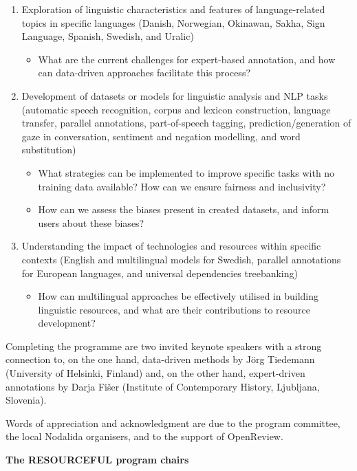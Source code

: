 \begin{enumerate}
    \item Exploration of linguistic characteristics and features of language-related topics in specific languages (Danish, Norwegian, Okinawan, Sakha, Sign Language, Spanish, Swedish, and Uralic)
    \begin{itemize}
        \item What are the current challenges for expert-based annotation, and how can data-driven approaches facilitate this process?
    \end{itemize}
    \item Development of datasets or models for linguistic analysis and NLP tasks (automatic speech recognition, corpus and lexicon construction, language transfer, parallel annotations, part-of-speech tagging, prediction/generation of gaze in conversation, sentiment and negation modelling, and word substitution)
    \begin{itemize}
        \item What strategies can be implemented to improve specific tasks with no training data available? How can we ensure fairness and inclusivity?
        \item How can we assess the biases present in created datasets, and inform users about these biases?
    \end{itemize}
    \item Understanding the impact of technologies and resources within specific contexts (English and multilingual models for Swedish, parallel annotations for European languages, and universal dependencies treebanking)
    \begin{itemize}
        \item How can multilingual approaches be effectively utilised in building linguistic resources, and what are their contributions to resource development?
    \end{itemize}    
\end{enumerate}

Completing the programme are two invited keynote speakers with a strong connection to, on the one hand, data-driven methods by Jörg Tiedemann (University of Helsinki, Finland) and, on the other hand, expert-driven annotations by Darja Fišer (Institute of Contemporary History, Ljubljana, Slovenia).
\vspace{2ex}

Words of appreciation and acknowledgment are due to the program committee, the local Nodalida organisers, and to the support of OpenReview.
\vspace{7ex}

\textbf{The RESOURCEFUL program chairs}
